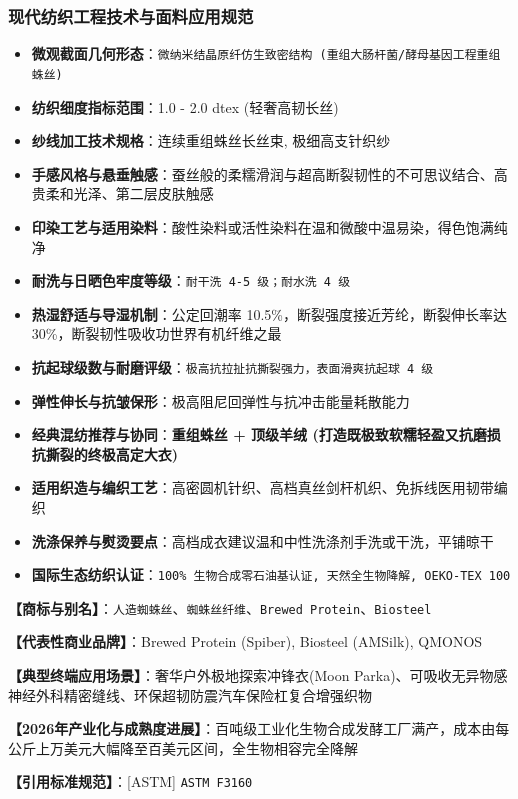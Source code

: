 \documentclass[11pt,openright,twoside,UTF8]{ctexbook}
\begin{document}
\subsubsection*{现代纺织工程技术与面料应用规范}
\begin{itemize} \setlength{\itemsep}{2pt}
    \item \textbf{微观截面几何形态}：\texttt{微纳米结晶原纤仿生致密结构 (重组大肠杆菌/酵母基因工程重组蛛丝)}
    \item \textbf{纺织细度指标范围}：1.0 - 2.0 dtex (轻奢高韧长丝)
    \item \textbf{纱线加工技术规格}：连续重组蛛丝长丝束, 极细高支针织纱
    \item \textbf{手感风格与悬垂触感}：蚕丝般的柔糯滑润与超高断裂韧性的不可思议结合、高贵柔和光泽、第二层皮肤触感
    \item \textbf{印染工艺与适用染料}：酸性染料或活性染料在温和微酸中温易染，得色饱满纯净
    \item \textbf{耐洗与日晒色牢度等级}：\texttt{耐干洗 4-5 级；耐水洗 4 级}
    \item \textbf{热湿舒适与导湿机制}：公定回潮率 10.5\%，断裂强度接近芳纶，断裂伸长率达 30\%，断裂韧性吸收功世界有机纤维之最
    \item \textbf{抗起球级数与耐磨评级}：\texttt{极高抗拉扯抗撕裂强力，表面滑爽抗起球 4 级}
    \item \textbf{弹性伸长与抗皱保形}：极高阻尼回弹性与抗冲击能量耗散能力
    \item \textbf{经典混纺推荐与协同}：\textbf{重组蛛丝 + 顶级羊绒 (打造既极致软糯轻盈又抗磨损抗撕裂的终极高定大衣)}
    \item \textbf{适用织造与编织工艺}：高密圆机针织、高档真丝剑杆机织、免拆线医用韧带编织
    \item \textbf{洗涤保养与熨烫要点}：高档成衣建议温和中性洗涤剂手洗或干洗，平铺晾干
    \item \textbf{国际生态纺织认证}：\texttt{100\% 生物合成零石油基认证, 天然全生物降解, OEKO-TEX 100}
\end{itemize}
\vspace{0.2cm}

\noindent\textbf{【商标与别名】}：\texttt{人造蜘蛛丝}、\texttt{蜘蛛丝纤维}、\texttt{Brewed Protein}、\texttt{Biosteel}\par
\noindent\textbf{【代表性商业品牌】}：Brewed Protein (Spiber), Biosteel (AMSilk), QMONOS\par
\noindent\textbf{【典型终端应用场景】}：奢华户外极地探索冲锋衣(Moon Parka)、可吸收无异物感神经外科精密缝线、环保超韧防震汽车保险杠复合增强织物\par
\noindent\textbf{【2026年产业化与成熟度进展】}：百吨级工业化生物合成发酵工厂满产，成本由每公斤上万美元大幅降至百美元区间，全生物相容完全降解\par
\noindent\textbf{【引用标准规范】}：[ASTM] \texttt{ASTM F3160}\par
\vspace{0.5cm}
\end{document}
